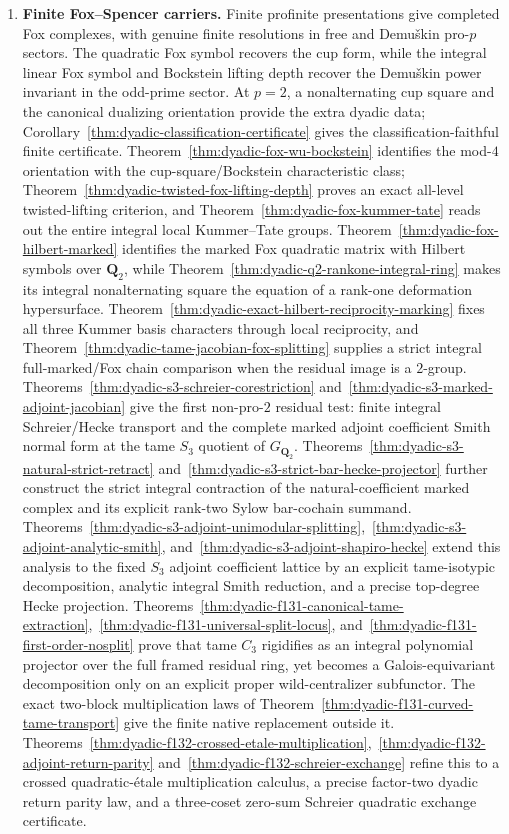 \documentclass[11pt]{article}
\theoremstyle{definition}
\begin{document}
\begin{enumerate}[label=\textbf{(\arabic*)}]
\item \textbf{Finite Fox--Spencer carriers.}
Finite profinite presentations give completed Fox complexes, with genuine finite resolutions in free and Demu\v{s}kin pro-$p$ sectors.  The quadratic Fox symbol recovers the cup form, while the integral linear Fox symbol and Bockstein lifting depth recover the Demu\v{s}kin power invariant in the odd-prime sector.  At $p=2$, a nonalternating cup square and the canonical dualizing orientation provide the extra dyadic data; Corollary~\ref{thm:dyadic-classification-certificate} gives the classification-faithful finite certificate.  Theorem~\ref{thm:dyadic-fox-wu-bockstein} identifies the mod-$4$ orientation with the cup-square/Bockstein characteristic class; Theorem~\ref{thm:dyadic-twisted-fox-lifting-depth} proves an exact all-level twisted-lifting criterion, and Theorem~\ref{thm:dyadic-fox-kummer-tate} reads out the entire integral local Kummer--Tate groups.  Theorem~\ref{thm:dyadic-fox-hilbert-marked} identifies the marked Fox quadratic matrix with Hilbert symbols over $\mathbf Q_2$, while Theorem~\ref{thm:dyadic-q2-rankone-integral-ring} makes its integral nonalternating square the equation of a rank-one deformation hypersurface.  Theorem~\ref{thm:dyadic-exact-hilbert-reciprocity-marking} fixes all three Kummer basis characters through local reciprocity, and Theorem~\ref{thm:dyadic-tame-jacobian-fox-splitting} supplies a strict integral full-marked/Fox chain comparison when the residual image is a $2$-group.  Theorems~\ref{thm:dyadic-s3-schreier-corestriction} and~\ref{thm:dyadic-s3-marked-adjoint-jacobian} give the first non-pro-$2$ residual test: finite integral Schreier/Hecke transport and the complete marked adjoint coefficient Smith normal form at the tame $S_3$ quotient of $G_{\mathbf Q_2}$.  Theorems~\ref{thm:dyadic-s3-natural-strict-retract} and~\ref{thm:dyadic-s3-strict-bar-hecke-projector} further construct the strict integral contraction of the natural-coefficient marked complex and its explicit rank-two Sylow bar-cochain summand.  Theorems~\ref{thm:dyadic-s3-adjoint-unimodular-splitting},~\ref{thm:dyadic-s3-adjoint-analytic-smith}, and~\ref{thm:dyadic-s3-adjoint-shapiro-hecke} extend this analysis to the fixed $S_3$ adjoint coefficient lattice by an explicit tame-isotypic decomposition, analytic integral Smith reduction, and a precise top-degree Hecke projection.  Theorems~\ref{thm:dyadic-f131-canonical-tame-extraction},~\ref{thm:dyadic-f131-universal-split-locus}, and~\ref{thm:dyadic-f131-first-order-nosplit} prove that tame $C_3$ rigidifies as an integral polynomial projector over the full framed residual ring, yet becomes a Galois-equivariant decomposition only on an explicit proper wild-centralizer subfunctor.  The exact two-block multiplication laws of Theorem~\ref{thm:dyadic-f131-curved-tame-transport} give the finite native replacement outside it.  Theorems~\ref{thm:dyadic-f132-crossed-etale-multiplication},~\ref{thm:dyadic-f132-adjoint-return-parity} and~\ref{thm:dyadic-f132-schreier-exchange} refine this to a crossed quadratic-\'etale multiplication calculus, a precise factor-two dyadic return parity law, and a three-coset zero-sum Schreier quadratic exchange certificate.  
\end{enumerate}
\end{document}
